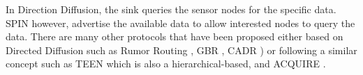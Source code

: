 In Direction Diffusion, the sink queries the sensor nodes for the specific data. SPIN however, advertise the available data to allow interested nodes to query the data. There are many other protocols that have been proposed either based on Directed Diffusion such as Rumor Routing \cite{rumorrouting}, GBR \cite{schurgers2001energy}, CADR \cite{cadr}) or following a similar concept such as TEEN \cite{teen} which is also a hierarchical-based, and ACQUIRE \cite{acquire}.





